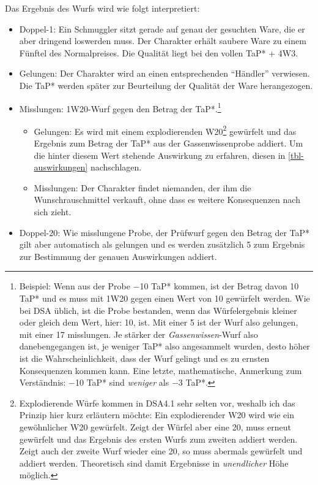 Das Ergebnis des Wurfs wird wie folgt interpretiert:
\begin{itemize}
	\item Doppel-1: Ein Schmuggler sitzt gerade auf genau der gesuchten Ware, die er aber dringend loswerden muss. Der Charakter erhält saubere Ware zu einem Fünftel des Normalpreises. Die Qualität liegt bei den vollen TaP* + 4W3.
	\item Gelungen: Der Charakter wird an einen entsprechenden \enquote{Händler} verwiesen. Die TaP* werden später zur Beurteilung der Qualität der Ware herangezogen.
	\item Misslungen: 1W20-Wurf gegen den Betrag der TaP*.\footnote{Beispiel: Wenn aus der Probe −10 TaP* kommen, ist der Betrag davon 10 TaP* und es muss mit 1W20 gegen einen Wert von 10 gewürfelt werden. Wie bei DSA üblich, ist die Probe bestanden, wenn das Würfelergebnis kleiner oder gleich dem Wert, hier: 10, ist. Mit einer 5 ist der Wurf also gelungen, mit einer 17 misslungen. Je stärker der \emph{Gassenwissen}-Wurf also danebengegangen ist, je weniger TaP* also angesammelt wurden, desto höher ist die Wahrscheinlichkeit, dass der Wurf gelingt und es zu ernsten Konsequenzen kommen kann. Eine letzte, mathematische, Anmerkung zum Verständnis: −10 TaP* sind \emph{weniger} als −3 TaP*.}
		\begin{itemize}
			\item Gelungen: Es wird mit einem explodierenden W20\footnote{Explodierende Würfe kommen in DSA4.1 sehr selten vor, weshalb ich das Prinzip hier kurz erläutern möchte: Ein explodierender W20 wird wie ein gewöhnlicher W20 gewürfelt. Zeigt der Würfel aber eine 20, muss erneut gewürfelt und das Ergebnis des ersten Wurfs zum zweiten addiert werden. Zeigt auch der zweite Wurf wieder eine 20, so muss abermals gewürfelt und addiert werden. Theoretisch sind damit Ergebnisse in \emph{unendlicher} Höhe möglich.} gewürfelt und das Ergebnis zum Betrag der TaP* aus der Gassenwissenprobe addiert. Um die hinter diesem Wert stehende Auswirkung zu erfahren, diesen in \vref{tbl-auswirkungen} nachschlagen.
			\item Misslungen: Der Charakter findet niemanden, der ihm die Wunschrauschmittel verkauft, ohne dass es weitere Konsequenzen nach sich zieht.
		\end{itemize}
	\item Doppel-20: Wie misslungene Probe, der Prüfwurf gegen den Betrag der TaP* gilt aber automatisch als gelungen und es werden zusätzlich 5 zum Ergebnis zur Bestimmung der genauen Auswirkungen addiert.
\end{itemize}

